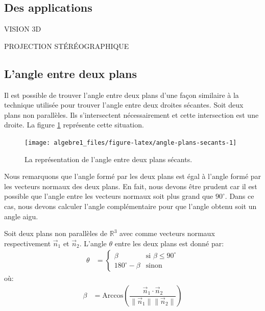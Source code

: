 \documentclass[]{book}
\theoremstyle{definition}
\theoremstyle{definition}
\theoremstyle{definition}
\theoremstyle{remark}
\let\BeginKnitrBlock\begin \let\EndKnitrBlock\end
\begin{document}
\hypertarget{des-applications-2}{%
\subsection{Des applications}\label{des-applications-2}}

\BeginKnitrBlock{example}
\protect\hypertarget{exm:unnamed-chunk-230}{}{\label{exm:unnamed-chunk-230} }VISION 3D
\EndKnitrBlock{example}

\BeginKnitrBlock{example}
\protect\hypertarget{exm:unnamed-chunk-231}{}{\label{exm:unnamed-chunk-231} }PROJECTION STÉRÉOGRAPHIQUE
\EndKnitrBlock{example}

\hypertarget{langle-entre-deux-plans}{%
\subsection{L'angle entre deux plans}\label{langle-entre-deux-plans}}

Il est possible de trouver l'angle entre deux plans d'une façon similaire à la technique utilisée pour trouver l'angle entre deux droites sécantes. Soit deux plans non parallèles. Ils s'intersectent nécessairement et cette intersection est une droite. La figure \ref{fig:angle-plans-secants} représente cette situation.

\begin{figure}

{\centering \texttt{[image: algebre1\_files/figure-latex/angle-plans-secants-1]} 

}

\caption{La représentation de l'angle entre deux plans sécants.}\label{fig:angle-plans-secants}
\end{figure}

Nous remarquons que l'angle formé par les deux plans est égal à l'angle formé par les vecteurs normaux des deux plans. En fait, nous devons être prudent car il est possible que l'angle entre les vecteurs normaux soit plus grand que \(90^{\circ}\). Dans ce cas, nous devons calculer l'angle complémentaire pour que l'angle obtenu soit un angle aigu.

\BeginKnitrBlock{definition}[L'angle entre deux plans]
\protect\hypertarget{def:unnamed-chunk-232}{}{\label{def:unnamed-chunk-232} {} }Soit deux plans non parallèles de \(\mathbb{R}^3\) avec comme vecteurs normaux respectivement \(\vec n_1\) et \(\vec n_2\). L'angle \(\theta\) entre les deux plans est donné par:
\begin{align*}
\theta &= \begin{cases}
\beta & \text{si } \beta\leq 90^{\circ} \\
180^{\circ}-\beta & \text{sinon}
\end{cases}
\end{align*}
où:
\begin{align*}
\beta &= \text{Arccos}\left(\dfrac{\vec n_1 \cdot \vec n_2}{\lVert\vec n_1\rVert\lVert\vec n_2\rVert}\right)
\end{align*}
\EndKnitrBlock{definition}
\end{document}
